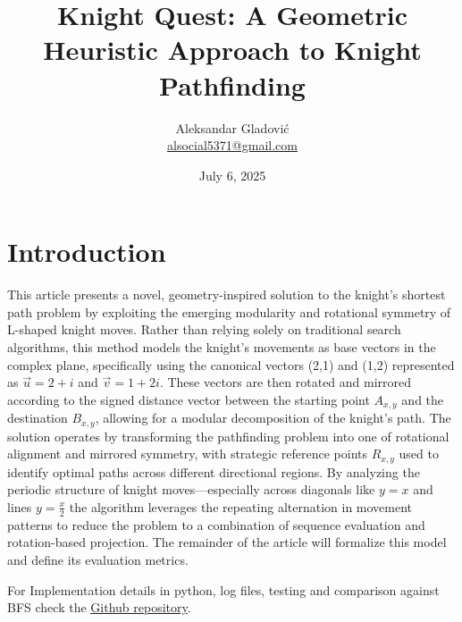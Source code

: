 \documentclass[a4paper, 12pt]{article}
\title{Knight Quest: A Geometric Heuristic Approach to Knight Pathfinding} %
\author{Aleksandar Gladović  \\[0.2cm] \href{mailto:alsocial5371@gmail.com}{alsocial5371@gmail.com}}        %
\date{July 6, 2025}                 %
\begin{document}
\maketitle       %
\tableofcontents %
\newpage         %


\section{Introduction}
This article presents a novel, geometry-inspired solution to the knight’s shortest path problem by exploiting the 
emerging modularity and rotational symmetry of L-shaped knight moves. Rather than relying solely on traditional search 
algorithms, this method models the knight’s movements as base vectors in the complex plane, specifically using the 
canonical vectors (2,1) and (1,2) represented as \( \overrightarrow{u} = 2 + i \) and \( \overrightarrow{v} = 1 + 2i \).
These vectors are then rotated and mirrored according to the signed distance vector between the starting point \( A_{x,y} \)
and the destination \( B_{x,y} \), allowing for a modular decomposition of the knight's path. The solution operates by 
transforming the pathfinding problem into one of rotational alignment and mirrored symmetry, with strategic reference points
\( R_{x,y} \) used to identify optimal paths across different directional regions. By analyzing the periodic structure of 
knight moves—especially across diagonals like \( y = x \) and lines \( y = \frac{x}{2} \) the algorithm leverages the 
repeating alternation in movement patterns to reduce the problem to a combination of sequence evaluation and rotation-based 
projection. The remainder of the article will formalize this model and define its evaluation metrics.

\vspace{1em}
\noindent For Implementation details in python, log files, testing and comparison against BFS check the 
\href{https://github.com/WhyNotAleksandar/knight-quest}{Github repository}.
\newpage

\end{document}
